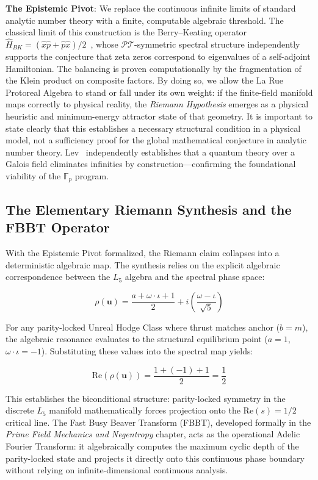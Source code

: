 \textbf{The Epistemic Pivot}: We replace the continuous infinite limits of standard analytic number theory with a finite, computable algebraic threshold. The classical limit of this construction is the Berry--Keating operator $\hat{H}_{BK} = (\hat{x}\hat{p} + \hat{p}\hat{x})/2$~\cite{bender-brody-muller}, whose $\mathcal{PT}$-symmetric spectral structure independently supports the conjecture that zeta zeros correspond to eigenvalues of a self-adjoint Hamiltonian. The balancing is proven computationally by the fragmentation of the Klein product on composite factors. By doing so, we allow the La Rue Protoreal Algebra to stand or fall under its own weight: if the finite-field manifold maps correctly to physical reality, the \emph{Riemann Hypothesis} emerges as a physical heuristic and minimum-energy attractor state of that geometry. It is important to state clearly that this establishes a necessary structural condition in a physical model, not a sufficiency proof for the global mathematical conjecture in analytic number theory. Lev~\cite{lev-gfqt, lev-finite-math} independently establishes that a quantum theory over a Galois field eliminates infinities by construction---confirming the foundational viability of the $\mathbb{F}_p$ program.

\subsection{The Elementary Riemann Synthesis and the FBBT Operator}

With the Epistemic Pivot formalized, the Riemann claim collapses into a deterministic algebraic map. The synthesis relies on the explicit algebraic correspondence between the $L_5$ algebra and the spectral phase space:

\begin{equation}
\rho(\mathbf{u}) = \frac{a + \omega \cdot \iota + 1}{2} + i \left( \frac{\omega - \iota}{\sqrt{5}} \right)
\end{equation}

For any parity-locked Unreal Hodge Class where thrust matches anchor ($b=m$), the algebraic resonance evaluates to the structural equilibrium point ($a=1$, $\omega \cdot \iota = -1$). Substituting these values into the spectral map yields:

\begin{equation}
\text{Re}(\rho(\mathbf{u})) = \frac{1 + (-1) + 1}{2} = \frac{1}{2}
\end{equation}

This establishes the biconditional structure: parity-locked symmetry in the discrete $L_5$ manifold mathematically forces projection onto the $\text{Re}(s) = 1/2$ critical line. The Fast Busy Beaver Transform (FBBT), developed formally in the \emph{Prime Field Mechanics and Negentropy} chapter, acts as the operational Adelic Fourier Transform: it algebraically computes the maximum cyclic depth of the parity-locked state and projects it directly onto this continuous phase boundary without relying on infinite-dimensional continuous analysis.

